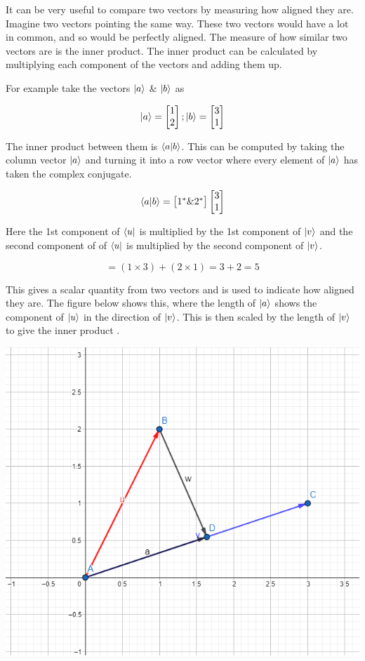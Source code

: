 \documentclass{book}
\begin{document}
It can be very useful to compare two vectors by measuring how aligned they are. Imagine two vectors pointing the same way. These two vectors would have a lot in common, and so would be perfectly aligned. The measure of how similar two vectors are is the inner product. The inner product can be calculated by multiplying each component of the vectors and adding them up. 

For example take the vectors $\ket{a}$ \& $\ket{b}$ as 

 $$
 \ket{a} = \begin{bmatrix} 1 \\ 2 \end{bmatrix} ;  \ket{b} = \begin{bmatrix} 3 \\ 1 \end{bmatrix} 
 $$

 The inner product between them is $\braket{a|b}$. This can be computed by taking the column vector $\ket{a}$ and turning it into a row vector where every element of $\ket{a}$ has taken the complex conjugate. 

 $$
\braket{a|b} = \begin{bmatrix} 1^* \& 2^* \end{bmatrix}  \begin{bmatrix} 3 \\ 1 \end{bmatrix}
 $$

Here the 1st component of $\bra{u}$ is multiplied by the 1st component of $\ket{v}$ and the second component of of $\bra{u}$ is multiplied by the second component of $\ket{v}$.

$$
= (1 \times 3) + (2 \times 1) = 3 + 2 = 5 
$$

This gives a scalar quantity from two vectors and is used to indicate how aligned they are. The figure below shows this, where the length of $\ket{a}$ shows the component of $\ket{u}$ in the direction of $\ket{v}$. This is then scaled by the length of $\ket{v}$ to give the inner product . 

\includegraphics[scale=0.5]{images/Dot_product_visualisation.png}
\end{document}
